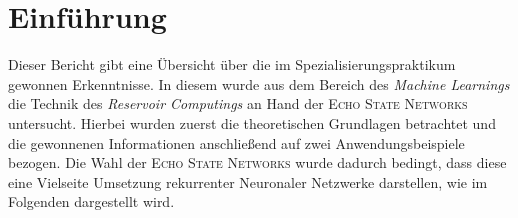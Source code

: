 \chapter{Einführung}
Dieser Bericht gibt eine Übersicht über die im Spezialisierungspraktikum gewonnen Erkenntnisse. In diesem wurde aus dem Bereich des \textit{Machine Learnings} die Technik des \textit{Reservoir Computings} an Hand der \textsc{Echo State Networks} untersucht. Hierbei wurden zuerst die theoretischen Grundlagen betrachtet und die gewonnenen Informationen anschließend auf zwei Anwendungsbeispiele bezogen. Die Wahl der \textsc{Echo State Networks} wurde dadurch bedingt, dass diese eine Vielseite Umsetzung rekurrenter Neuronaler Netzwerke darstellen, wie im Folgenden dargestellt wird.